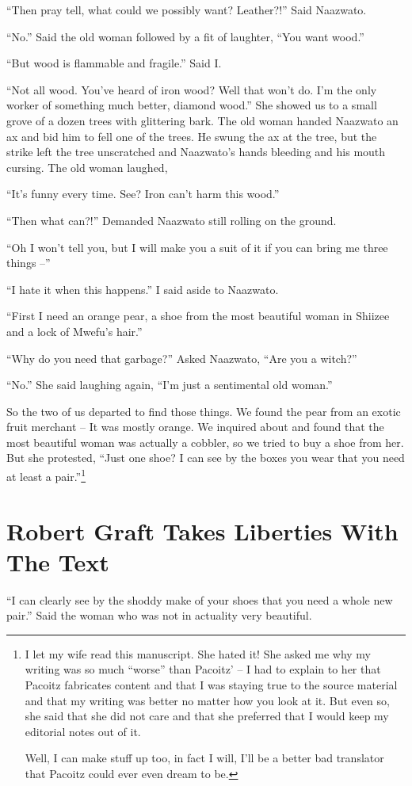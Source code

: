 ``Then pray tell, what could we possibly want? Leather?!'' Said Naazwato.

``No.'' Said the old woman followed by a fit of laughter, ``You want wood.''

``But wood is flammable and fragile.'' Said I.

``Not all wood. You've heard of iron wood? Well that won't do. I'm the only worker of something much better, diamond wood.'' She showed us to a small grove of a dozen trees with glittering bark. The old woman handed Naazwato an ax and bid him to fell one of the trees. He swung the ax at the tree, but the strike left the tree unscratched and Naazwato's hands bleeding and his mouth cursing. The old woman laughed,

``It's funny every time. See? Iron can't harm this wood.'' 

``Then what can?!'' Demanded Naazwato still rolling on the ground.

``Oh I won't tell you, but I will make you a suit of it if you can bring me three things --''

``I hate it when this happens.'' I said aside to Naazwato.

``First I need an orange pear, a shoe from the most beautiful woman in Shiizee and a lock of Mwefu's hair.''

``Why do you need that garbage?'' Asked Naazwato, ``Are you a witch?''

``No.'' She said laughing again, ``I'm just a sentimental old woman.''

So the two of us departed to find those things. We found the pear from an exotic fruit merchant -- It was mostly orange. We inquired about and found that the most beautiful woman was actually a cobbler, so we tried to buy a shoe from her. But she protested, ``Just one shoe? I can see by the boxes you wear that you need at least a pair.''\footnote{I let my wife read this manuscript. She hated it!
She asked me why my writing was so much ``worse'' than Pacoitz' -- I had to explain to her that Pacoitz fabricates content and that I was staying true to the source material and that my writing was better no matter how you look at it. But even so, she said that she did not care and that she preferred that I would keep my editorial notes out of it.

Well, I can make stuff up too, in fact I will, I'll be a better bad translator that Pacoitz could ever even dream to be.}

\chapter{Robert Graft Takes Liberties With The Text}
``I can clearly see by the shoddy make of your shoes that you need a whole new pair.'' Said the woman who was not in actuality very beautiful.

